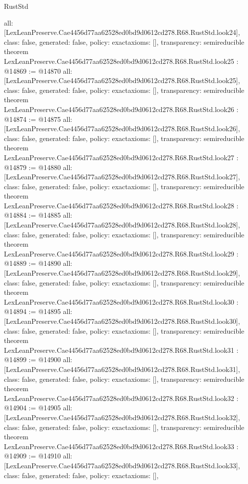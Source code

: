 \begin{lexlean}{RustStd}
\begin{coremodule}
{  all: [LexLeanPreserve.Cae4456d77aa62528ed0bd9d0612cd278.R68.RustStd.look24],
  class: false,
  generated: false,
  policy: exact{axioms: []},
  transparency: semireducible
}
theorem LexLeanPreserve.Cae4456d77aa62528ed0bd9d0612cd278.R68.RustStd.look25 : @14869 := @14870 {
  all: [LexLeanPreserve.Cae4456d77aa62528ed0bd9d0612cd278.R68.RustStd.look25],
  class: false,
  generated: false,
  policy: exact{axioms: []},
  transparency: semireducible
}
theorem LexLeanPreserve.Cae4456d77aa62528ed0bd9d0612cd278.R68.RustStd.look26 : @14874 := @14875 {
  all: [LexLeanPreserve.Cae4456d77aa62528ed0bd9d0612cd278.R68.RustStd.look26],
  class: false,
  generated: false,
  policy: exact{axioms: []},
  transparency: semireducible
}
theorem LexLeanPreserve.Cae4456d77aa62528ed0bd9d0612cd278.R68.RustStd.look27 : @14879 := @14880 {
  all: [LexLeanPreserve.Cae4456d77aa62528ed0bd9d0612cd278.R68.RustStd.look27],
  class: false,
  generated: false,
  policy: exact{axioms: []},
  transparency: semireducible
}
theorem LexLeanPreserve.Cae4456d77aa62528ed0bd9d0612cd278.R68.RustStd.look28 : @14884 := @14885 {
  all: [LexLeanPreserve.Cae4456d77aa62528ed0bd9d0612cd278.R68.RustStd.look28],
  class: false,
  generated: false,
  policy: exact{axioms: []},
  transparency: semireducible
}
theorem LexLeanPreserve.Cae4456d77aa62528ed0bd9d0612cd278.R68.RustStd.look29 : @14889 := @14890 {
  all: [LexLeanPreserve.Cae4456d77aa62528ed0bd9d0612cd278.R68.RustStd.look29],
  class: false,
  generated: false,
  policy: exact{axioms: []},
  transparency: semireducible
}
theorem LexLeanPreserve.Cae4456d77aa62528ed0bd9d0612cd278.R68.RustStd.look30 : @14894 := @14895 {
  all: [LexLeanPreserve.Cae4456d77aa62528ed0bd9d0612cd278.R68.RustStd.look30],
  class: false,
  generated: false,
  policy: exact{axioms: []},
  transparency: semireducible
}
theorem LexLeanPreserve.Cae4456d77aa62528ed0bd9d0612cd278.R68.RustStd.look31 : @14899 := @14900 {
  all: [LexLeanPreserve.Cae4456d77aa62528ed0bd9d0612cd278.R68.RustStd.look31],
  class: false,
  generated: false,
  policy: exact{axioms: []},
  transparency: semireducible
}
theorem LexLeanPreserve.Cae4456d77aa62528ed0bd9d0612cd278.R68.RustStd.look32 : @14904 := @14905 {
  all: [LexLeanPreserve.Cae4456d77aa62528ed0bd9d0612cd278.R68.RustStd.look32],
  class: false,
  generated: false,
  policy: exact{axioms: []},
  transparency: semireducible
}
theorem LexLeanPreserve.Cae4456d77aa62528ed0bd9d0612cd278.R68.RustStd.look33 : @14909 := @14910 {
  all: [LexLeanPreserve.Cae4456d77aa62528ed0bd9d0612cd278.R68.RustStd.look33],
  class: false,
  generated: false,
  policy: exact{axioms: []},
}
\end{coremodule}
\end{lexlean}
